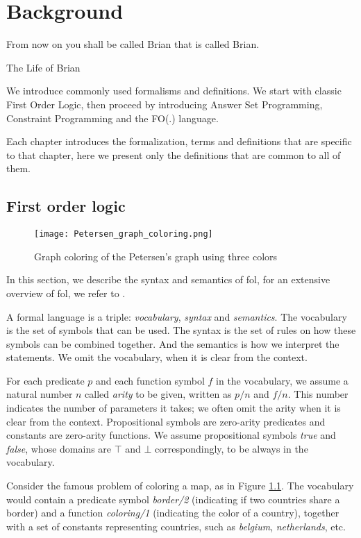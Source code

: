 \chapter{Background} \label{ch:background}
\epigraph{From now on you shall be called Brian that is called Brian.}{The Life of Brian}
We introduce commonly used formalisms and definitions. We start with classic First Order Logic, then proceed by introducing Answer Set Programming, Constraint Programming and the FO(.) language.

Each chapter introduces the formalization, terms and definitions that are specific to that chapter, here we present only the definitions that are common to all of them.

\section{First order logic} \label{sec:fol}
\begin{figure}[t]
  \centering
  \texttt{[image: Petersen\_graph\_coloring.png]}
  \caption{Graph coloring of the Petersen's graph using three colors}
  \label{fig:petersen_coloring}
\end{figure}
In this section, we describe the syntax and semantics of \acrshort{fol},
for an extensive overview of \acrshort{fol}, we refer to \textcite{fo_overview}.

A formal language is a triple: \textit{vocabulary}, \textit{syntax} and \textit{semantics}. The vocabulary is the set of symbols that can be used. The syntax is the set of rules on how these symbols can be combined together. And the semantics is how we interpret the statements. We omit the vocabulary, when it is clear from the context.

For each predicate $p$ and each function symbol $f$ in the vocabulary, we assume a natural number $n$ called \textit{arity} to be given, written as $p/n$ and $f/n$. This number indicates the number of parameters it takes; we often omit the arity when it is clear from the context. Propositional symbols are zero-arity predicates and constants are zero-arity functions. 
We assume propositional symbols \textit{true} and \textit{false}, whose domains are $\top$ and $\bot$ correspondingly, to be always in the vocabulary.

\begin{example}\label{example:predicates_and_functions}
  Consider the famous problem of coloring a map, as in Figure \ref{fig:petersen_coloring}. The vocabulary would contain a predicate symbol \textit{border/2} (indicating if two countries share a border) and a function \textit{coloring/1} (indicating the color of a country), together with a set of constants representing countries, such as \textit{belgium}, \textit{netherlands}, etc.
\end{example}

